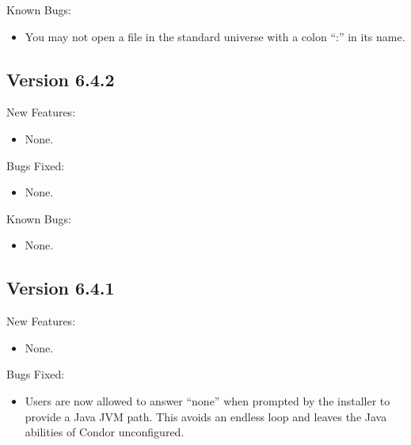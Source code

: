 \noindent Known Bugs:
\begin{itemize}

\item You may not open a file in the standard universe with a colon ``:'' in
its name.

\end{itemize}

\subsection{\label{sec:New-6-4-2}Version 6.4.2}
\noindent New Features:
\begin{itemize}

\item None.

\end{itemize}

\noindent Bugs Fixed:
\begin{itemize}
\item None.

\end{itemize}
\noindent Known Bugs:
\begin{itemize}

\item None.

\end{itemize}

\subsection{\label{sec:New-6-4-1}Version 6.4.1}
\noindent New Features:
\begin{itemize}

\item None.

\end{itemize}

\noindent Bugs Fixed:
\begin{itemize}

\item Users are now allowed to answer ``none'' when prompted by the
installer to provide a Java JVM path. This avoids an endless loop and
leaves the Java abilities of Condor unconfigured.

\end{itemize}

